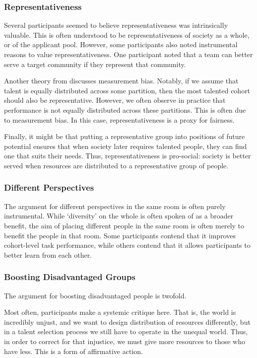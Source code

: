 \subsubsection{Representativeness}
Several participants seemed to believe representativeness was intrinsically valuable. This is often understood to be representativeness of society as a whole, or of the applicant pool. However, some participants also noted instrumental reasons to value representativeness. One participant noted that a team can better serve a target community if they represent that community.

Another theory from \textcite{Friedler_Scheidegger_Venkatasubramanian_2016} discusses measurement bias. Notably, if we assume that talent is equally distributed across some partition, then the most talented cohort should also be representative. However, we often observe in practice that performance is not equally distributed across these partitions. This is often due to measurement bias. In this case, representativeness is a proxy for fairness.

Finally, it might be that putting a representative group into positions of future potential ensures that when society later requires talented people, they can find one that suits their needs. Thus, representativeness is pro-social: society is better served when resources are distributed to a representative group of people.

\subsubsection{Different Perspectives}
The argument for different perspectives in the same room is often purely instrumental. While `diversity' on the whole is often spoken of as a broader benefit, the aim of placing different people in the same room is often merely to benefit the people in that room. Some participants contend that it improves cohort-level task performance, while others contend that it allows participants to better learn from each other. 

\subsubsection{Boosting Disadvantaged Groups}
The argument for boosting disadvantaged people is twofold. 

Most often, participants make a systemic critique here. That is, the world is incredibly unjust, and we want to design distribution of resources differently, but in a talent selection process we still have to operate in the unequal world. Thus, in order to correct for that injustice, we must give more resources to those who have less. This is a form of affirmative action.

